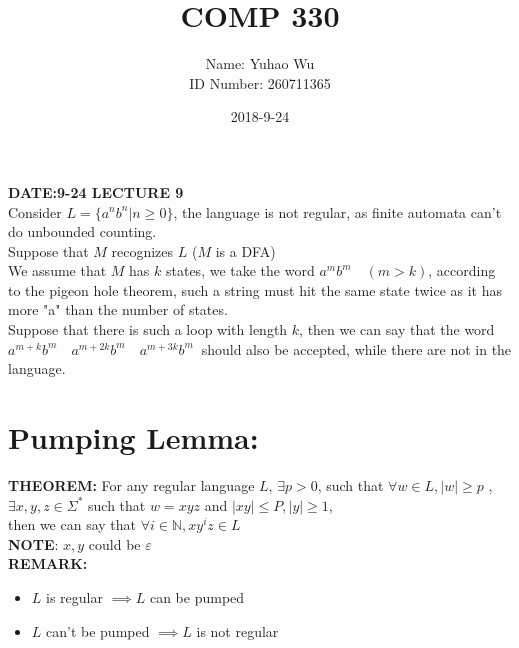 \documentclass [9 pt]{article}
\theoremstyle{definition}
\begin{document}
\title{COMP 330}
\date{2018-9-24}
\author{Name: Yuhao Wu\\
ID Number: 260711365
}
\maketitle


\textbf{DATE:9-24 LECTURE 9}\\
\newline
Consider $L = \{a^n b^n| n \geq 0 \}$, the language is not regular, as finite automata can't do unbounded counting.\\
Suppose that $M$ recognizes $L$ ($M$ is a DFA)\\
We assume that $M$ has $k$ states, we take the word $a^m b^m\quad (m > k)$, according to the pigeon hole theorem, such a string must hit the same state twice as it has more "a" than the number of states. \\
Suppose that there is such a loop with length $k$, then we can say that the word $ a^{m+k} b^m\quad a^{m+2k} b^m\quad a^{m+3k} b^m\ $ should also be accepted, while there are not in the language.\\
\section*{Pumping Lemma:}
\textbf{THEOREM:} For any regular language $L$, $\exists p >0$, such that  
$\forall w \in L, |w| \geq p $ , $ \exists x, y, z\in \Sigma^* $  such that $w = x y z$ and $|x y| \leq P , |y| \geq 1$,\\
then we can say that $\forall i \in \mathbb{N}, xy^{i}z \in L$\\
\textbf{NOTE}: $x, y$ could be $\varepsilon$\\
\newline
\textbf{REMARK:}
\begin{itemize}
	\item $L$ is regular $\implies L$ can be pumped
	\item $L $ can't be pumped $\implies L$ is not regular
\end{itemize}
\end{document}
